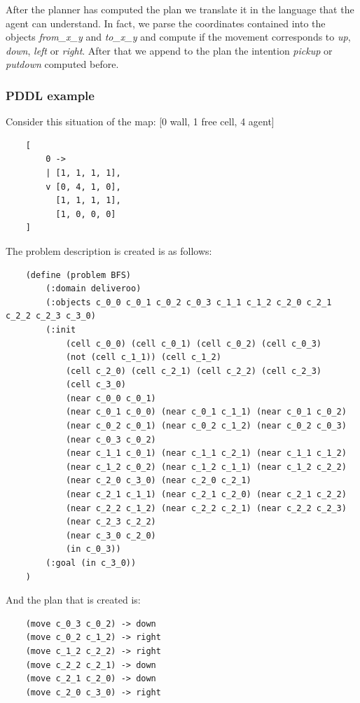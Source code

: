 \documentclass[a4paper, 11pt]{article}
\begin{document}
After the planner has computed the plan we translate it in the language that the agent can understand. In fact, we parse the coordinates contained into the objects \emph{from\_x\_y} and \emph{to\_x\_y} and compute if the movement corresponds to \emph{up}, \emph{down}, \emph{left} or \emph{right}. After that we append to the plan the intention \emph{pickup} or \emph{putdown} computed before.\\

\subsubsection{PDDL example}

Consider this situation of the map: [0 wall, 1 free cell, 4 agent]
\begin{verbatim}
    [
        0 ->
        | [1, 1, 1, 1],
        v [0, 4, 1, 0],
          [1, 1, 1, 1],
          [1, 0, 0, 0]
    ]
\end{verbatim}

The problem description is created is as follows:
\begin{verbatim}
    (define (problem BFS)
        (:domain deliveroo)
        (:objects c_0_0 c_0_1 c_0_2 c_0_3 c_1_1 c_1_2 c_2_0 c_2_1 c_2_2 c_2_3 c_3_0)
        (:init 
            (cell c_0_0) (cell c_0_1) (cell c_0_2) (cell c_0_3)
            (not (cell c_1_1)) (cell c_1_2)
            (cell c_2_0) (cell c_2_1) (cell c_2_2) (cell c_2_3)
            (cell c_3_0)
            (near c_0_0 c_0_1)
            (near c_0_1 c_0_0) (near c_0_1 c_1_1) (near c_0_1 c_0_2)
            (near c_0_2 c_0_1) (near c_0_2 c_1_2) (near c_0_2 c_0_3)
            (near c_0_3 c_0_2)
            (near c_1_1 c_0_1) (near c_1_1 c_2_1) (near c_1_1 c_1_2)
            (near c_1_2 c_0_2) (near c_1_2 c_1_1) (near c_1_2 c_2_2)
            (near c_2_0 c_3_0) (near c_2_0 c_2_1)
            (near c_2_1 c_1_1) (near c_2_1 c_2_0) (near c_2_1 c_2_2)
            (near c_2_2 c_1_2) (near c_2_2 c_2_1) (near c_2_2 c_2_3)
            (near c_2_3 c_2_2)
            (near c_3_0 c_2_0)
            (in c_0_3))
        (:goal (in c_3_0))
    )
\end{verbatim}

And the plan that is created is:
\begin{verbatim}
    (move c_0_3 c_0_2) -> down
    (move c_0_2 c_1_2) -> right
    (move c_1_2 c_2_2) -> right
    (move c_2_2 c_2_1) -> down
    (move c_2_1 c_2_0) -> down
    (move c_2_0 c_3_0) -> right
\end{verbatim}
\end{document}
